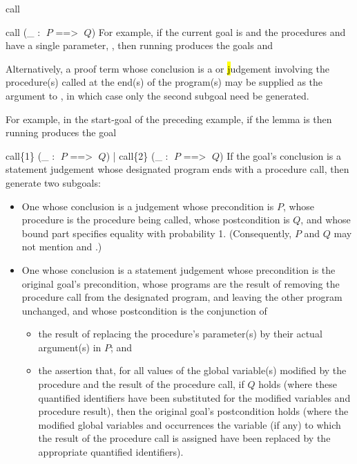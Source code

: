 \begin{tactic}{call}
\begin{tsyntax}{call (_ : $\;P$ ==> $\;Q$)}
  \medskip
  For example, if the current goal is
  and the procedures  and  have a single parameter,
  , then running
   produces the
  goals  and

  \bigskip
  Alternatively, a proof term whose conclusion is a \prhl or
  \hl judgement involving the procedure(s) called at the
  end(s) of the program(s) may be supplied as the argument to
  , in which case only the second subgoal need be
  generated.

  \medskip
  For example, in the start-goal of the preceding example,
  if the lemma  is
  then running
   produces the
  goal 
  \end{tsyntax}

  \begin{tsyntax}{call\{1\} (_ : $\;P$ ==> $\;Q$) | call\{2\} (_ : $\;P$ ==> $\;Q$)}
    If the goal's conclusion is a \prhl statement judgement whose
    designated program ends with a procedure call, then generate two
    subgoals:
  \begin{itemize}
  \item One whose conclusion is a \phl judgement whose precondition is
    $P$, whose procedure is the procedure being called, whose
    postcondition is $Q$, and whose bound part specifies equality with
    probability 1.
    (Consequently, $P$ and $Q$ may not mention  and
    .)

  \item One whose conclusion is a \prhl statement judgement whose
    precondition is the original goal's precondition, whose programs
    are the result of removing the procedure call from the designated
    program, and leaving the other program unchanged, and whose
    postcondition is the conjunction of
    \begin{itemize}
    \item the result of replacing the procedure's
      parameter(s) by their actual argument(s) in $P$; and

    \item the assertion that, for all values of the global variable(s)
      modified by the procedure and the result of the procedure call,
      if $Q$ holds (where these quantified identifiers have been
      substituted for the modified variables and procedure result),
      then the original goal's postcondition holds (where the modified
      global variables and occurrences the variable (if any) to which
      the result of the procedure call is assigned have been replaced
      by the appropriate quantified identifiers).
    \end{itemize}
  \end{itemize}


\end{tsyntax}
\end{tactic}
